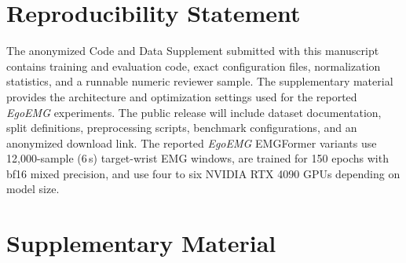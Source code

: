 \documentclass[letterpaper]{article} %
\newcommand{\dataset}{\textit{EgoEMG}}
\newcommand{\model}{EMGFormer}
\newif\ifmainonly
\begin{document}
\section*{Reproducibility Statement}

The anonymized Code and Data Supplement submitted with this manuscript contains training and evaluation code, exact configuration files, normalization statistics, and a runnable numeric reviewer sample. The supplementary material provides the architecture and optimization settings used for the reported \dataset{} experiments. The public release will include dataset documentation, split definitions, preprocessing scripts, benchmark configurations, and an anonymized download link. The reported \dataset{} \model{} variants use 12{,}000-sample (6\,s) target-wrist EMG windows, are trained for 150 epochs with bf16 mixed precision, and use four to six NVIDIA RTX 4090 GPUs depending on model size.



\ifmainonly
\else
\clearpage
\setcounter{page}{1}
\onecolumn
\section*{Supplementary Material}
\appendix
\end{document}

